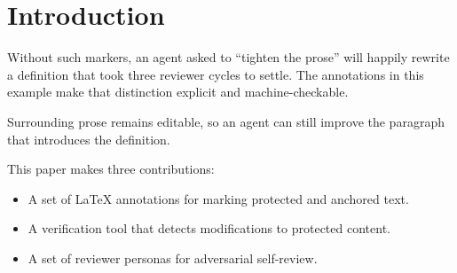 \section{Introduction}


Without such markers, an agent asked to ``tighten the prose'' will happily
rewrite a definition that took three reviewer cycles to settle. The annotations
in this example make that distinction explicit and machine-checkable.

Surrounding prose remains editable, so an agent can still improve the paragraph
that introduces the definition.


This paper makes three contributions:
\begin{itemize}
  \item A set of LaTeX annotations for marking protected and anchored text.
  \item A verification tool that detects modifications to protected content.
  \item A set of reviewer personas for adversarial self-review.
\end{itemize}
